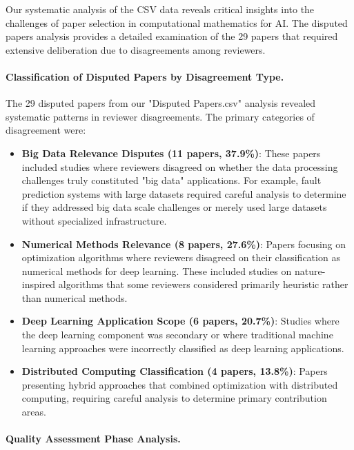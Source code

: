 \documentclass[acmsmall]{acmart}
\begin{document}
Our systematic analysis of the CSV data reveals critical insights into the challenges of paper selection in computational mathematics for AI. The disputed papers analysis provides a detailed examination of the 29 papers that required extensive deliberation due to disagreements among reviewers.

\paragraph{Classification of Disputed Papers by Disagreement Type.}

The 29 disputed papers from our "Disputed Papers.csv" analysis revealed systematic patterns in reviewer disagreements. The primary categories of disagreement were:

\begin{itemize}
    \item \textbf{Big Data Relevance Disputes (11 papers, 37.9\%)}: These papers included studies where reviewers disagreed on whether the data processing challenges truly constituted "big data" applications. For example, fault prediction systems with large datasets required careful analysis to determine if they addressed big data scale challenges or merely used large datasets without specialized infrastructure.
    
    \item \textbf{Numerical Methods Relevance (8 papers, 27.6\%)}: Papers focusing on optimization algorithms where reviewers disagreed on their classification as numerical methods for deep learning. These included studies on nature-inspired algorithms that some reviewers considered primarily heuristic rather than numerical methods.
    
    \item \textbf{Deep Learning Application Scope (6 papers, 20.7\%)}: Studies where the deep learning component was secondary or where traditional machine learning approaches were incorrectly classified as deep learning applications.
    
    \item \textbf{Distributed Computing Classification (4 papers, 13.8\%)}: Papers presenting hybrid approaches that combined optimization with distributed computing, requiring careful analysis to determine primary contribution areas.
\end{itemize}

\paragraph{Quality Assessment Phase Analysis.}
\end{document}
